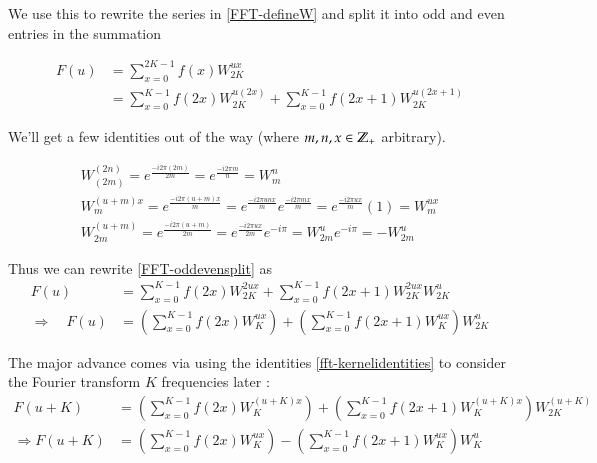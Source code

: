 		We use this to rewrite the series in \cref{FFT-defineW} and split it into odd and even entries in the summation
		
		\begin{align}
		F(u) &= \sum_{x=0}^{2K-1} f(x) W_{2K}^{ux} \\
			 &= \sum_{x=0}^{K-1} f(2x) W_{2K}^{u(2x)}
				 + \sum_{x=0}^{K-1} f(2x+1) W_{2K}^{u(2x+1)} \label{FFT-oddevensplit}
		\end{align}
		
		We'll get a few identities out of the way (where $m, n, x \in \mathbb{Z}_{+}$ arbitrary).
		
		\begin{gather} \label{fft-kernelidentities}
		W_{(2m)}^{(2n)} = e^{\frac{-i2\pi(2m)}{2m}} = e^{\frac{-i2\pi m}{n}} = W_{m}^{n} \\
		W_{m}^{(u+m)x} = e^{\frac{-i2\pi(u+m)x}{m} } = e^{\frac{-i2\pi unx}{m}} e^{\frac{-i2\pi mx}{m}}
					= e^{\frac{-i2\pi ux }{m}} (1) = W_m^{ux} \\
		W_{2m}^{(u+m)} = e^{\frac{-i2\pi(u+m)}{2m}} = e^{\frac{-i2\pi ux}{2m}} e^{-i\pi}
					 = W_{2m}^{u} e^{-i\pi} = - W_{2m}^{u}
		\end{gather}

Thus we can rewrite \cref{FFT-oddevensplit} as
\begin{align}
F(u)  &= \sum_{x=0}^{K-1} f(2x) W_{2K}^{2ux} + \sum_{x=0}^{K-1} f(2x+1) W_{2K}^{2ux} W_{2K}^{u} \\
\Longrightarrow \quad F(u) &= \left(\sum_{x=0}^{K-1} f(2x) W_{K}^{ux}\right)
	 + \left(\sum_{x=0}^{K-1} f(2x+1) W_{K}^{ux}\right) W_{2K}^{u}
		 \label{fft-oddeven-parens}
\end{align} 

The major advance comes via using the identities \cref{fft-kernelidentities}  to consider the Fourier transform $K$ 
frequencies later :
\begin{align}
F(u+K) &= \left(\sum_{x=0}^{K-1} f(2x) W_{K}^{(u+K)x}\right)
+ \left(\sum_{x=0}^{K-1} f(2x+1) W_{K}^{(u+K)x}\right) W_{2K}^{(u+K)}\\
\Longrightarrow F(u+K) &= \left(\sum_{x=0}^{K-1} f(2x) W_{K}^{ux}\right)-\left(\sum_{x=0}^{K-1} f(2x+1)W_K^{ux}\right) W_K^{u}
\label{fft-oddeven-parens-plusK}
\end{align}


